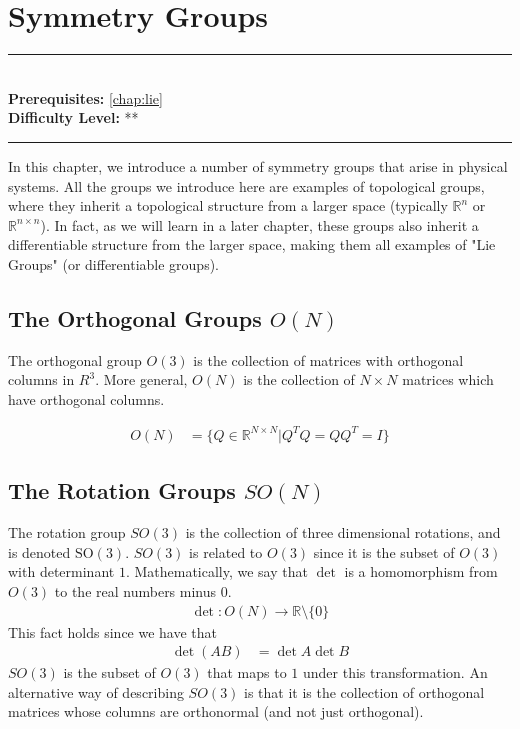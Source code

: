 \documentclass[book.tex]{subfiles}
\begin{document}
\chapter{Symmetry Groups}

\label{chap:lorentz_group}
\noindent\rule{11cm}{0.4pt} \\
\textbf{Prerequisites:} \autoref{chap:lie} \\
\textbf{Difficulty Level:} ** \\
\noindent\rule{11cm}{0.4pt}
\vspace{5mm}

In this chapter, we introduce a number of symmetry groups that arise in physical systems. All the groups we introduce here are examples of topological groups, where they inherit a topological structure from a larger space (typically $\mathbb{R}^n$ or $\mathbb{R}^{n \times n}$). In fact, as we will learn in a later chapter, these groups also inherit a differentiable structure from the larger space, making them all examples of "Lie Groups" (or differentiable groups). 

\section{The Orthogonal Groups $O(N)$}

The orthogonal group $O(3)$ is the collection of matrices with orthogonal columns in $R^3$. More general, $O(N)$ is the collection of $N \times N$ matrices which have orthogonal columns.

\begin{align}
O(N) &= \{ Q \in \mathbb{R}^{N \times N} | Q^T Q = QQ^T = I\}
\end{align}


\section{The Rotation Groups $SO(N)$}

The rotation group $SO(3)$ is the collection of three dimensional rotations, and is denoted $\textrm{SO}(3)$. $SO(3)$ is related to $O(3)$ since it is the subset of $O(3)$ with determinant $1$. Mathematically, we say that $\det$ is a homomorphism from $O(3)$ to the real numbers minus $0$.
\begin{align}
\det : O(N) \to \mathbb{R} \setminus \{0 \}
\end{align}
This fact holds since we have that
\begin{align}
\det(AB) &= \det A \det B
\end{align}
$SO(3)$ is the subset of $O(3)$ that maps to $1$ under this transformation. An alternative way of describing $SO(3)$ is that it is the collection of orthogonal matrices whose columns are orthonormal (and not just orthogonal).
\end{document}
